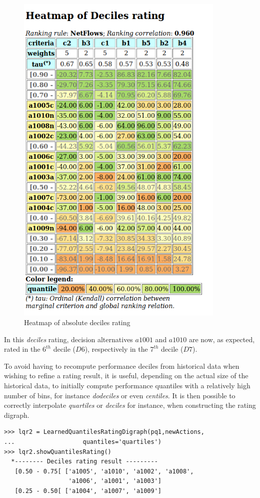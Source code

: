 \begin{figure}[h]
\includegraphics[width=10cm]{Figures/heatMap2.png}
\caption{Heatmap of absolute deciles rating}
\label{fig:10.4}       %
\end{figure}
\clearpage
In this \emph{deciles} rating, decision alternatives $a1001$ and $a1010$ are now, as expected, rated in the $6^{th}$ decile ($D6$), respectively in the $7^{th}$ decile ($D7$).

To avoid having to recompute performance deciles from historical data when wishing to refine a rating result, it is useful, depending on the actual size of the historical data, to initially compute performance quantiles with a relatively high number of bins, for instance \emph{dodeciles} or even \emph{centiles}. It is then possible to correctly interpolate \emph{quartiles} or \emph{deciles} for instance, when constructing the rating digraph. 

\begin{lstlisting}[caption={From deciles interpolated quartiles rating result},label=list:10.10]
>>> lqr2 = LearnedQuantilesRatingDigraph(pq1,newActions,
...                   quantiles='quartiles')
>>> lqr2.showQuantilesRating()
  *-------- Deciles rating result ---------
   [0.50 - 0.75[ ['a1005', 'a1010', 'a1002', 'a1008',
                  'a1006', 'a1001', 'a1003']
   [0.25 - 0.50[ ['a1004', 'a1007', 'a1009']
\end{lstlisting}

